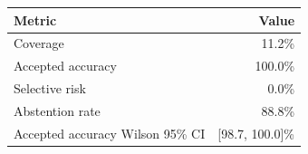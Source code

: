 \begin{tabular}{lr}
\toprule
Metric & Value \\
\midrule
Coverage & 11.2\% \\
Accepted accuracy & 100.0\% \\
Selective risk & 0.0\% \\
Abstention rate & 88.8\% \\
Accepted accuracy Wilson 95\% CI & [98.7, 100.0]\% \\
\bottomrule
\end{tabular}
